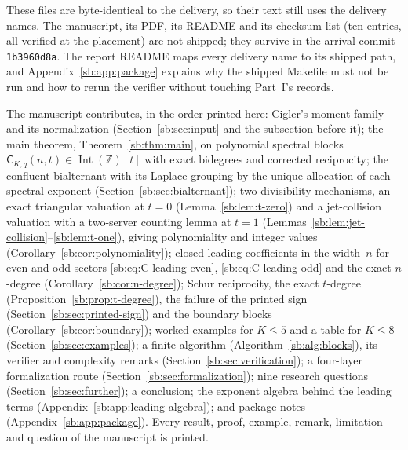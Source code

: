 \documentclass[11pt]{article}
\theoremstyle{definition}
\theoremstyle{remark}
\newcommand{\Z}{\mathbb Z}
\newcommand{\IntZ}{\operatorname{Int}(\Z)}
\newcommand{\Cblock}{\mathsf C}
\theoremstyle{definition}
\theoremstyle{plain}
\numberwithin{equation}{section}
\begin{document}
\noindent These files are byte-identical to the delivery, so their text
still uses the delivery names. The manuscript, its PDF, its README and its
checksum list  (ten entries, all verified at the placement)
are not shipped; they survive in the arrival commit \texttt{1b3960d8a}. The
report README maps every delivery name to its shipped path, and
Appendix~\ref{sb:app:package} explains why the shipped Makefile must not be
run and how to rerun the verifier without touching Part~I's records.

The manuscript contributes, in the order printed here: Cigler's moment
family and its normalization (Section~\ref{sb:sec:input} and the subsection
before it); the main theorem, Theorem~\ref{sb:thm:main}, on polynomial
spectral blocks $\Cblock_{K,q}(n,t)\in\IntZ[t]$ with exact bidegrees and
corrected reciprocity; the confluent bialternant with its Laplace grouping
by the unique allocation of each spectral exponent
(Section~\ref{sb:sec:bialternant}); two divisibility mechanisms, an exact
triangular valuation at $t=0$ (Lemma~\ref{sb:lem:t-zero}) and a
jet-collision valuation with a two-server counting lemma at $t=1$
(Lemmas~\ref{sb:lem:jet-collision}--\ref{sb:lem:t-one}), giving
polynomiality and integer values (Corollary~\ref{sb:cor:polynomiality});
closed leading coefficients in the width~$n$ for even and odd sectors
\eqref{sb:eq:C-leading-even}, \eqref{sb:eq:C-leading-odd} and the exact
$n$-degree (Corollary~\ref{sb:cor:n-degree}); Schur reciprocity, the exact
$t$-degree (Proposition~\ref{sb:prop:t-degree}), the failure of the printed
sign (Section~\ref{sb:sec:printed-sign}) and the boundary blocks
(Corollary~\ref{sb:cor:boundary}); worked examples for $K\le5$ and a table
for $K\le8$ (Section~\ref{sb:sec:examples}); a finite algorithm
(Algorithm~\ref{sb:alg:blocks}), its verifier and complexity remarks
(Section~\ref{sb:sec:verification}); a four-layer formalization route
(Section~\ref{sb:sec:formalization}); nine research questions
(Section~\ref{sb:sec:further}); a conclusion; the exponent algebra behind
the leading terms (Appendix~\ref{sb:app:leading-algebra}); and package notes
(Appendix~\ref{sb:app:package}). Every result, proof, example, remark,
limitation and question of the manuscript is printed.
\end{document}
